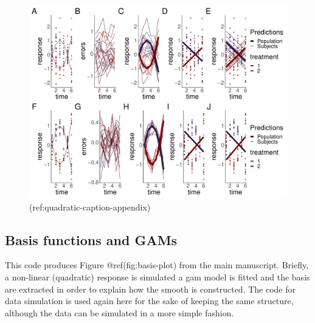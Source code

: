 \documentclass[Royal,times,sagev]{sagej}
\begin{document}
\begin{figure}
\centering
\includegraphics{Full_document_SAGE_files/figure-latex/quadratic-cases-Appendix-1.pdf}
\caption{(ref:quadratic-caption-appendix)}
\end{figure}

\hypertarget{basis-functions-and-gams}{%
\subsection{Basis functions and GAMs}\label{basis-functions-and-gams}}

This code produces Figure @ref(fig:basis-plot) from the main manuscript.
Briefly, a non-linear (quadratic) response is simulated a gam model is
fitted and the basis are extracted in order to explain how the smooth is
constructed. The code for data simulation is used again here for the
sake of keeping the same structure, although the data can be simulated
in a more simple fashion.
\end{document}
